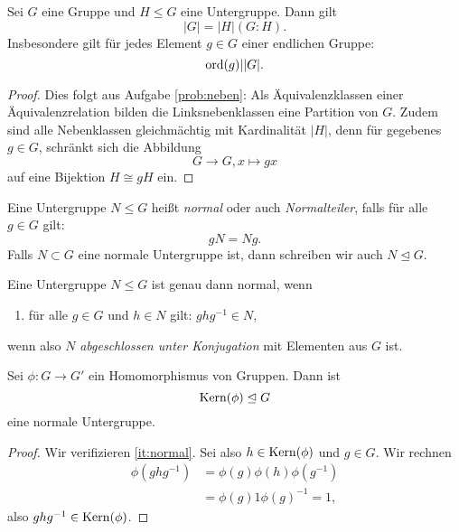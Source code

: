 \documentclass{book}
\begin{document}
\begin{cor}
    \label{cor:lagrange} Sei $G$ eine Gruppe und $H \le G$ eine Untergruppe. Dann gilt
    \[
        |G| = |H| (G:H).
    \]
    Insbesondere gilt für jedes Element $g \in G$ einer endlichen Gruppe: 
    \[
        \operatorname{ord}(g) | |G|.
    \]
\end{cor}
\begin{proof}
    Dies folgt aus Aufgabe \ref{prob:neben}: Als Äquivalenzklassen einer
    Äquivalenzrelation bilden die Linksnebenklassen eine Partition von $G$.
    Zudem sind alle Nebenklassen gleichmächtig mit Kardinalität $|H|$, denn für
    gegebenes $g \in G$, schränkt sich die Abbildung
    \[
        G \to G, x \mapsto gx
    \]
    auf eine Bijektion $H \cong gH$ ein. 
\end{proof}

\begin{defi}
    \label{defi:normal}
    Eine Untergruppe $N \le G$ heißt \emph{normal} oder auch \emph{Normalteiler}, falls für alle $g \in G$ gilt:
    \[
        gN = Ng.
    \]
    Falls $N \subset G$ eine normale Untergruppe ist, dann schreiben wir auch $N \trianglelefteq G$. 
\end{defi}

\begin{rem}
    \label{rem:normal}
    Eine Untergruppe $N \le G$ ist genau dann normal, wenn
    \begin{enumerate}[label=(N\arabic*),leftmargin=1.2cm]
        \item\label{it:normal} für alle $g \in G$ und $h \in N$ gilt: $ghg^{-1} \in N$, 
    \end{enumerate}
    wenn also $N$ \emph{abgeschlossen unter Konjugation} mit Elementen aus $G$ ist.  
\end{rem}

\begin{prop}
    \label{prop:kernnormal}
    Sei $\phi: G \to G'$ ein Homomorphismus von Gruppen. Dann ist 
    \[
        \Kern(\phi) \no G
    \]
    eine normale Untergruppe. 
\end{prop}
\begin{proof}
    Wir verifizieren \ref{it:normal}. Sei also $h \in \Kern(\phi)$ und $g \in G$. Wir rechnen
    \begin{align*}
        \phi(g h g^{-1}) & = \phi(g) \phi(h) \phi(g^{-1})\\
                         & = \phi(g) 1 \phi(g)^{-1} = 1,
    \end{align*}
    also $g h g^{-1} \in \Kern(\phi)$. 
\end{proof}
\end{document}
